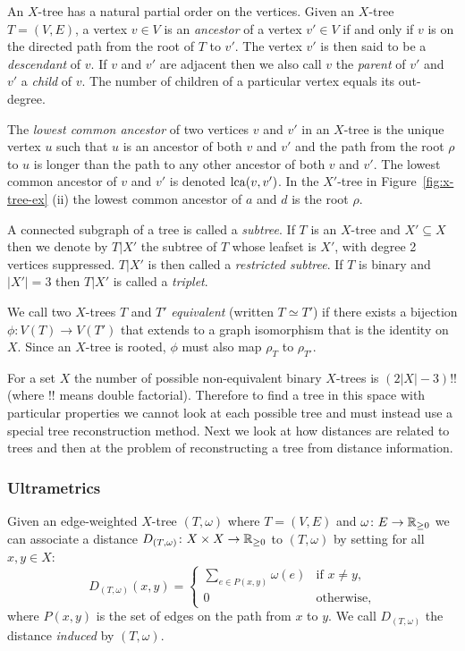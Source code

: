 An $X$-tree has a natural partial order on the vertices.  Given an $X$-tree
$T=(V,E)$, a vertex $v \in V$ is an \textit{ancestor} of a vertex $v' \in V$
if and only if $v$ is on the directed path from the root of $T$ to $v'$.  The
vertex $v'$ is then said to be a \textit{descendant} of $v$.  If $v$ and $v'$
are adjacent then we also call $v$ the \textit{parent} of $v'$ and $v'$ a
\textit{child} of $v$.  The number of children of a particular vertex equals
its out-degree.

The \textit{lowest common ancestor} of two vertices $v$ and $v'$ in an
$X$-tree is the unique vertex $u$ such that $u$ is an ancestor of both $v$ and
$v'$ and the path from the root $\rho$ to $u$ is longer than the path to any
other ancestor of both $v$ and $v'$.  The lowest common ancestor of $v$ and
$v'$ is denoted $\operatorname{lca}(v,v')$.  In the $X'$-tree in Figure~\ref{fig:x-tree-ex}
(ii) the lowest common ancestor of $a$ and $d$ is the root $\rho$.

A connected subgraph of a tree is called a \textit{subtree}.  If $T$ is an
$X$-tree and $X' \subseteq X$ then we denote by $T|X'$ the subtree of $T$
whose leafset is $X'$, with degree 2 vertices suppressed.  $T|X'$ is then
called a \textit{restricted subtree}.  If $T$ is binary and $|X'| = 3$ then
$T|X'$ is called a \textit{triplet}.

We call two $X$-trees $T$ and $T'$ \textit{equivalent} (written $T \simeq T'$)
if there exists a bijection $\phi \colon V(T) \to V(T')$ that extends to a
graph isomorphism that is the identity on $X$.  Since an $X$-tree is rooted,
$\phi$ must also map $\rho_{T}$ to $\rho_{T'}$.

For a set $X$ the number of possible non-equivalent binary $X$-trees is
$(2|X|-3)!!$ (where $!!$ means double factorial).  Therefore to find a tree in
this space with particular properties we cannot look at each possible tree and
must instead use a special tree reconstruction method.  Next we look at how
distances are related to trees and then at the problem of reconstructing a
tree from distance information.

\subsubsection{Ultrametrics}
\label{sec:ultrametrics}

Given an edge-weighted $X$-tree $(T,\omega)$ where $T=(V,E)$ and $\omega
\colon E \to {\mathbb R}_{\geq 0}$ we can associate a distance $D_{(T,\omega)} \colon X
\times X \to {\mathbb R}_{\geq 0}$ to $(T,\omega)$ by setting for all $x,y \in X$:
\begin{equation*}
  D_{(T,\omega)}(x,y) =
  \begin{cases}
    \displaystyle
    \sum_{e \in P(x,y)} \omega(e) & \text{if $x \neq y$},\\
    0 & \text{otherwise,}
  \end{cases}
\end{equation*}
where $P(x,y)$ is the set of edges on the path from $x$ to $y$.  We call
$D_{(T,\omega)}$ the distance \textit{induced} by $(T,\omega)$.

